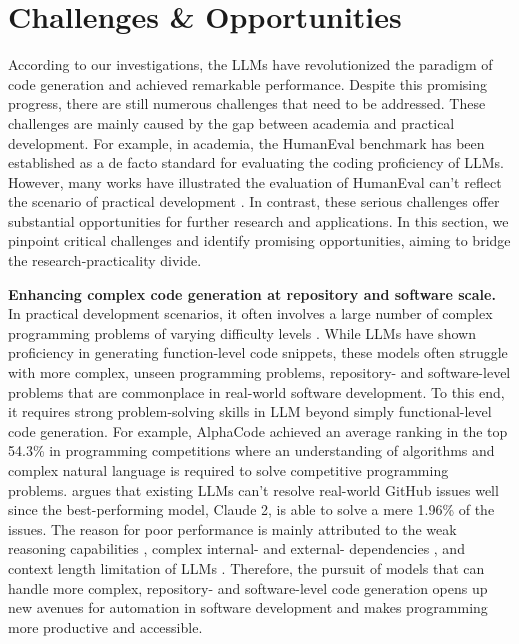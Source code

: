\section{Challenges \& Opportunities}\label{sec:challenges}
According to our investigations, the LLMs have revolutionized the paradigm of code generation and achieved remarkable performance. 
Despite this promising progress, there are still numerous challenges that need to be addressed. These challenges are mainly caused by the gap between academia and practical development. For example, in academia, the HumanEval benchmark has been established as a de facto standard for evaluating the coding proficiency of LLMs. However, many works have illustrated the evaluation of HumanEval can't reflect the scenario of practical development \cite{jimenez2023swe,du2024evaluating,liu2024your,ding2024crosscodeeval}.
In contrast, these serious challenges offer substantial opportunities for further research and applications. 
In this section, we pinpoint critical challenges and identify promising opportunities, aiming to bridge the research-practicality divide. 

\textbf{Enhancing complex code generation at repository and software scale.}
In practical development scenarios, it often involves a large number of complex programming problems of varying difficulty levels \cite{zhang2022automated,li2022competition}. 
While LLMs have shown proficiency in generating function-level code snippets, these models often struggle with more complex, unseen programming problems, repository- and software-level problems that are commonplace in real-world software development.
To this end, it requires strong problem-solving skills in LLM beyond simply functional-level code generation. 
For example, 
AlphaCode \cite{li2022competition} achieved an average ranking in the top 54.3\% in programming competitions where an understanding of algorithms and complex natural language is required to solve competitive programming problems.
\cite{jimenez2023swe} argues that existing LLMs can't resolve real-world GitHub issues well since the best-performing model, Claude 2, is able to solve a mere 1.96\% of the issues.
The reason for poor performance is mainly attributed to the weak reasoning capabilities \cite{huang2022towards}, complex internal- and external- dependencies \cite{bairi2023codeplan}, and context length limitation of LLMs \cite{bairi2023codeplan}.
Therefore, the pursuit of models that can handle more complex, repository- and software-level code generation opens up new avenues for automation in software development and makes programming more productive and accessible.


